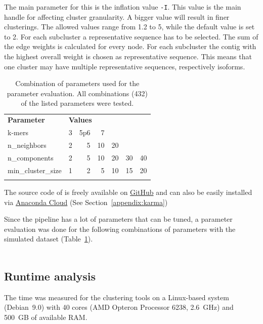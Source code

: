 \documentclass[12pt,a4paper,english]{article}
\begin{document}
	The main parameter for this is the inflation value \texttt{-I}. This value is the main handle for affecting cluster granularity. A bigger value will result in finer clusterings. The allowed values range from 1.2 to 5, while the default value is set to 2.
	For each subcluster a representative sequence has to be selected. The sum of the edge weights is calculated for every node. For each subcluster the contig with the highest overall weight is chosen as representative sequence. This means that one cluster may have multiple representative sequences, respectively isoforms.
	
	\begin{table}
		\caption[Combination of parameters used for the parameter evaluation.]{Combination of parameters used for the parameter evaluation. All combinations (432) of the listed parameters were tested.}
		\label{table:comb}
		\begin{tabular}{lrrrrrr}
			\toprule
			\multicolumn{1}{l}{\textbf{Parameter}} & \multicolumn{5}{l}{\textbf{Values}} \\ \addlinespace
			\midrule
			k-mers & 3 & 5p6 & 7 &  &  &  \\ \addlinespace
			n\_neighbors & 2 & 5 & 10 & 20 &  &  \\ \addlinespace
			n\_components & 2 & 5 & 10 & 20 & 30 & 40 \\ \addlinespace
			min\_cluster\_size & 1 & 2 & 5 & 10 & 15 & 20 \\ \addlinespace
			\bottomrule
		\end{tabular}
	\end{table}
	
	The source code of \karma is freely available on \href{https://github.com/lmfaber/karma}{GitHub} and can also be easily installed via \href{https://anaconda.org/lmfaber/karma}{Anaconda Cloud} (See Section~\ref{appendix:karma})
	
	Since the pipeline has a lot of parameters that can be tuned, a parameter evaluation was done for the following combinations of parameters with the simulated dataset (Table~\ref{table:comb}).\\
	\\
\subsection{Runtime analysis}
The time was measured for the clustering tools on a Linux-based system (Debian~9.0) with 40 cores (AMD Opteron Processor 6238, 2.6~GHz) and 500~GB of available RAM.
\end{document}
